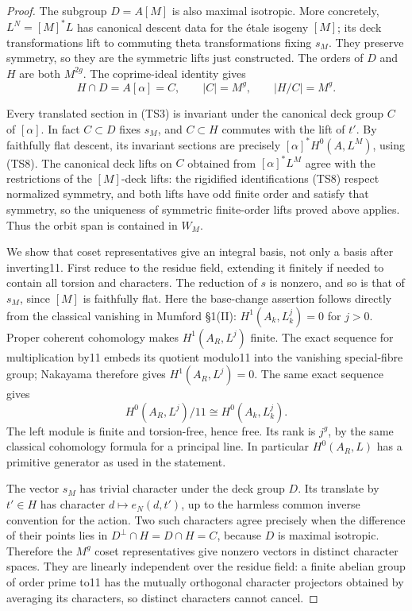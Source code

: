 \begin{proof}
The subgroup \(D=A[M]\) is also maximal isotropic. More concretely, \(L^N=[M]^*L\) has canonical descent data for the étale isogeny \([M]\); its deck transformations lift to commuting theta transformations fixing \(s_M\). They preserve symmetry, so they are the symmetric lifts just constructed. The orders of \(D\) and \(H\) are both \(M^{2g}\). The coprime-ideal identity gives \[
 H\cap D=A[\alpha]=C,\qquad |C|=M^g,
 \qquad |H/C|=M^g.
 \tag{TS10}
\]

Every translated section in (TS3) is invariant under the canonical deck group \(C\) of \([\alpha]\). In fact \(C\subset D\) fixes \(s_M\), and \(C\subset H\) commutes with the lift of \(t'\). By faithfully flat descent, its invariant sections are precisely \([\alpha]^*H^0(A,L^M)\), using (TS8). The canonical deck lifts on \(C\) obtained from \([\alpha]^*L^M\) agree with the restrictions of the \([M]\)-deck lifts: the rigidified identifications (TS8) respect normalized symmetry, and both lifts have odd finite order and satisfy that symmetry, so the uniqueness of symmetric finite-order lifts proved above applies. Thus the orbit span is contained in \(W_M\).

We show that coset representatives give an integral basis, not only a basis after inverting11. First reduce to the residue field, extending it finitely if needed to contain all torsion and characters. The reduction of \(s\) is nonzero, and so is that of \(s_M\), since \([M]\) is faithfully flat. Here the base-change assertion follows directly from the classical vanishing in Mumford §1(II): \(H^1(A_k,L_k^j)=0\) for \(j>0\). Proper coherent cohomology makes \(H^1(A_R,L^j)\) finite. The exact sequence for multiplication by11 embeds its quotient modulo11 into the vanishing special-fibre group; Nakayama therefore gives \(H^1(A_R,L^j)=0\). The same exact sequence gives \[
 H^0(A_R,L^j)/11\cong H^0(A_k,L_k^j).
 \tag{TS11}
\] The left module is finite and torsion-free, hence free. Its rank is \(j^g\), by the same classical cohomology formula for a principal line. In particular \(H^0(A_R,L)\) has a primitive generator as used in the statement.

The vector \(s_M\) has trivial character under the deck group \(D\). Its translate by \(t'\in H\) has character \(d\mapsto e_N(d,t')\), up to the harmless common inverse convention for the action. Two such characters agree precisely when the difference of their points lies in \(D^\perp\cap H=D\cap H=C\), because \(D\) is maximal isotropic. Therefore the \(M^g\) coset representatives give nonzero vectors in distinct character spaces. They are linearly independent over the residue field: a finite abelian group of order prime to11 has the mutually orthogonal character projectors obtained by averaging its characters, so distinct characters cannot cancel.


\end{proof}
